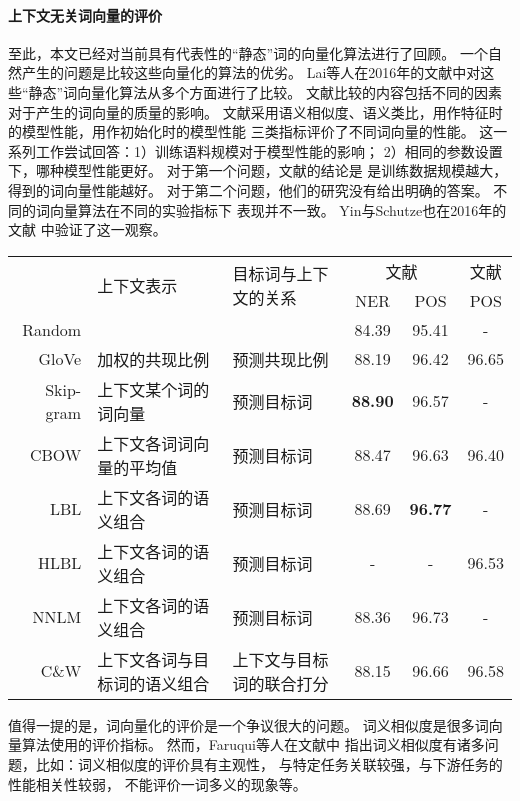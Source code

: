\paragraph{上下文无关词向量的评价}
至此，本文已经对当前具有代表性的``静态''词的向量化算法进行了回顾。
一个自然产生的问题是比较这些向量化的算法的优劣。
Lai等人在2016年的文献中对这些``静态''词向量化算法从多个方面进行了比较。
文献比较的内容包括不同的因素对于产生的词向量的质量的影响。
文献采用语义相似度、语义类比，用作特征时的模型性能，用作初始化时的模型性能
三类指标评价了不同词向量的性能。
这一系列工作尝试回答：1）训练语料规模对于模型性能的影响；
2）相同的参数设置下，哪种模型性能更好。
对于第一个问题，文献的结论是
是训练数据规模越大，得到的词向量性能越好。
对于第二个问题，他们的研究没有给出明确的答案。
不同的词向量算法在不同的实验指标下
表现并不一致。
Yin与Schutze也在2016年的文献
中验证了这一观察。

\begin{table}[t]
\centering
{}\label{tbl:1:emb-on-task}
\vspace{0.5em}\centering\wuhao
\begin{tabular}{r | p{4.3cm}p{2.8cm} | cc | c}
	\toprule[1.5pt]
	 & \multirow{2}{*}{上下文表示} &  \multirow{2}{2.5cm}{目标词与上下文的关系} & \multicolumn{2}{c|}{文献\inlinecite{7478417}} & 文献\inlinecite{yin-schutze:2016:P16-1} \\
	 &  &  & NER & POS & POS \\
	\midrule[1pt]
	Random & & & 84.39 & 95.41 & - \\
	\hdashline
	GloVe & 加权的共现比例 & 预测共现比例 & 88.19 & 96.42 & 96.65 \\
	Skip-gram & 上下文某个词的词向量 & 预测目标词& \textbf{88.90} & 96.57 & - \\
	CBOW & 上下文各词词向量的平均值& 预测目标词& 88.47 & 96.63 & 96.40 \\
	LBL & 上下文各词的语义组合& 预测目标词& 88.69 & \textbf{96.77} & - \\
	HLBL& 上下文各词的语义组合& 预测目标词& - & - & 96.53 \\
	NNLM & 上下文各词的语义组合& 预测目标词& 88.36 & 96.73 & - \\
	C\&W & 上下文各词与目标词的语义组合& 上下文与目标词的联合打分& 88.15 & 96.66 & 96.58 \\
	\bottomrule[1.5pt]
\end{tabular}
\end{table}
值得一提的是，词向量化的评价是一个争议很大的问题。
词义相似度是很多词向量算法使用的评价指标。
然而，Faruqui等人在文献中
指出词义相似度有诸多问题，比如：词义相似度的评价具有主观性，
与特定任务关联较强，与下游任务的性能相关性较弱，
不能评价一词多义的现象等。

